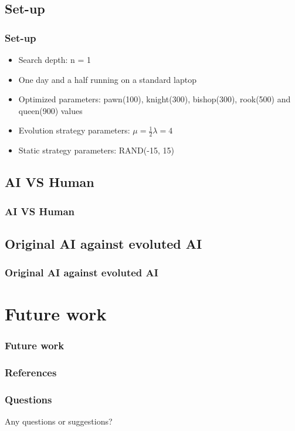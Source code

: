 \documentclass{beamer}
\begin{document}
\begin{frame}
\subsection{Set-up}
\frametitle{Set-up}
\begin{itemize}
\item Search depth: n = 1
\item One day and a half running on a standard laptop
\item Optimized parameters: pawn(100), knight(300), bishop(300), rook(500) and queen(900) values
\item Evolution strategy parameters: $\mu = \frac{1}{2} \lambda = 4$
\item Static strategy parameters: RAND(-15, 15)
\end{itemize}
\end{frame}

\begin{frame}
\subsection{AI VS Human}
\frametitle{AI VS Human}
\end{frame}

\begin{frame}
\subsection{Original AI against evoluted AI}
\frametitle{Original AI against evoluted AI}
\end{frame}

\section{Future work}
\begin{frame}
\tableofcontents[currentsection]
\end{frame}

\begin{frame}
\frametitle{Future work}
\end{frame}

\begin{frame}
\frametitle{References}
\end{frame}

\begin{frame}
\frametitle{Questions}
\begin{center}
\begin{Huge}
Any questions or suggestions?
\end{Huge}
\end{center}
\end{frame}
\end{document}

